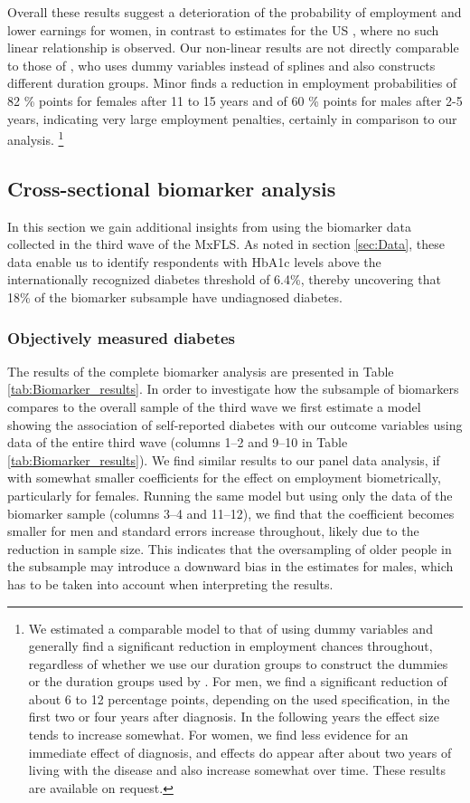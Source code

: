 \documentclass[12pt,english,british]{article}
\begin{document}
Overall these results suggest a deterioration of the probability of employment and lower earnings for women, in contrast to estimates for the US \citet{Minor2013}, where no such linear relationship is observed. Our non-linear results are not directly comparable to those of \citet{Minor2013}, who uses dummy variables instead of splines and also constructs different duration groups. Minor finds a reduction in employment probabilities of 82 \% points for females after 11 to 15 years and of 60 \% points for males after 2-5 years, indicating very large employment penalties, certainly in comparison to our analysis. \footnote{We estimated a comparable model to that of \citet{Minor2013} using dummy variables and generally find a significant reduction in employment chances throughout, regardless of whether we use our duration groups to construct the dummies or the duration groups used by \citet{Minor2013}. For men, we find a significant reduction of about 6 to 12 percentage points, depending on the used specification, in the first two or four years after diagnosis. In the following years the effect size tends to increase somewhat. For women, we find less evidence for an immediate effect of diagnosis, and  effects do appear after about two years of living with the disease and also increase somewhat over time. These results are available on request.}


\subsection{Cross-sectional biomarker analysis}


In this section we gain additional insights from using the biomarker data collected in the
third wave of the \ac{MxFLS}. As noted in section \ref{sec:Data}, these data enable us to identify respondents with
\ac{HbA1c} levels above the internationally recognized diabetes threshold of 6.4\%, thereby uncovering that 18\% of the biomarker subsample have undiagnosed diabetes. 



\subsubsection*{Objectively measured diabetes}


The results of the complete biomarker analysis are presented in Table \ref{tab:Biomarker_results}. In order to investigate how the subsample of biomarkers compares to the overall sample of the third wave we first estimate a model showing the association of self-reported diabetes with our outcome variables using data of the entire third wave (columns 1--2 and 9--10 in Table \ref{tab:Biomarker_results}). We find similar results to our panel data analysis, if with somewhat smaller coefficients for the effect on employment biometrically, particularly for females. Running the same model but using only the data of the biomarker sample (columns 3--4 and 11--12), we find that the coefficient becomes smaller for men and standard errors increase throughout, likely due to the reduction in sample size. This indicates that the oversampling of older people in the subsample may introduce a downward bias in the estimates for males, which has to be taken into account when interpreting the results.
\end{document}
